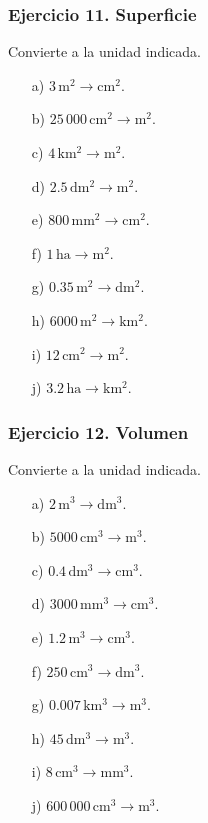\subsubsection*{Ejercicio 11. Superficie}

Convierte a la unidad indicada.

\begin{enumerate}
    \item[a)] $3\,\mathrm{m^2}\rightarrow\mathrm{cm^2}$.
    \item[b)] $25\,000\,\mathrm{cm^2}\rightarrow\mathrm{m^2}$.
    \item[c)] $4\,\mathrm{km^2}\rightarrow\mathrm{m^2}$.
    \item[d)] $2.5\,\mathrm{dm^2}\rightarrow\mathrm{m^2}$.
    \item[e)] $800\,\mathrm{mm^2}\rightarrow\mathrm{cm^2}$.
    \item[f)] $1\,\mathrm{ha}\rightarrow\mathrm{m^2}$.
    \item[g)] $0.35\,\mathrm{m^2}\rightarrow\mathrm{dm^2}$.
    \item[h)] $6000\,\mathrm{m^2}\rightarrow\mathrm{km^2}$.
    \item[i)] $12\,\mathrm{cm^2}\rightarrow\mathrm{m^2}$.
    \item[j)] $3.2\,\mathrm{ha}\rightarrow\mathrm{km^2}$.
\end{enumerate}

\subsubsection*{Ejercicio 12. Volumen}

Convierte a la unidad indicada.

\begin{enumerate}
    \item[a)] $2\,\mathrm{m^3}\rightarrow\mathrm{dm^3}$.
    \item[b)] $5000\,\mathrm{cm^3}\rightarrow\mathrm{m^3}$.
    \item[c)] $0.4\,\mathrm{dm^3}\rightarrow\mathrm{cm^3}$.
    \item[d)] $3000\,\mathrm{mm^3}\rightarrow\mathrm{cm^3}$.
    \item[e)] $1.2\,\mathrm{m^3}\rightarrow\mathrm{cm^3}$.
    \item[f)] $250\,\mathrm{cm^3}\rightarrow\mathrm{dm^3}$.
    \item[g)] $0.007\,\mathrm{km^3}\rightarrow\mathrm{m^3}$.
    \item[h)] $45\,\mathrm{dm^3}\rightarrow\mathrm{m^3}$.
    \item[i)] $8\,\mathrm{cm^3}\rightarrow\mathrm{mm^3}$.
    \item[j)] $600\,000\,\mathrm{cm^3}\rightarrow\mathrm{m^3}$.
\end{enumerate}


